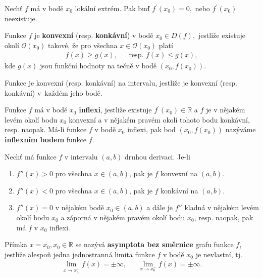 \begin{veta}
Nechť $f$ má v bodě $x_0$ lokální extrém. Pak buď $f^\prime(x_0)=0,$ nebo
$f^\prime(x_0)$ neexistuje.
\end{veta}

\begin{definition}\label{konvkonk}
Funkce $f$ je \textbf{konvexní} (resp. \textbf{konkávní}) v bodě $x_0\in D(f),$
jestliže existuje okolí $\mathscr O(x_0)$ takové, že pro všechna $x\in\mathscr O(x_0)$
platí
\begin{align*}
    f(x)\geq g(x), & & \textrm{resp. } f(x)\leq g(x),
\end{align*}
kde $g(x)$ jsou funkční hodnoty na tečně v bodě $(x_0,f(x_0)).$

Funkce je konvexní (resp. konkávní) na intervalu, jestliže je konvexní (resp.
konkávní) v~každém jeho bodě.
\end{definition}

\begin{definition}
Funkce $f$ má v bodě $x_0$ \textbf{inflexi}, jestliže existuje $f^\prime(x_0) \in
\mathbb R$ a $f$ je v nějakém levém okolí bodu $x_0$ konvexní a v nějakém pravém okolí
tohoto bodu konkávní, resp. naopak. Má-li funkce $f$ v bodě $x_0$ inflexi, pak bod
$(x_0, f(x_0))$ nazýváme \textbf{inflexním bodem} funkce $f$.
\end{definition}

\begin{veta}
Nechť má funkce $f$ v intervalu $(a,b)$ druhou derivaci. Je-li
\begin{enumerate}[$i.$]
\item $f'' (x)>0$ pro všechna $x \in (a,b)$, pak je $f$
konvexní na $(a,b)$.
\item $f''(x)<0$ pro všechna $x \in (a,b)$, pak je $f$
konkávní na $(a,b)$.
\item $f''(x)=0$ v nějakém bodě $x_0\in(a,b)$ a dále je $f''$
kladná v nějakém levém okolí bodu $x_0$ a záporná v nějakém pravém okolí bodu $x_0$,
resp. naopak, pak má $f$ v $x_0$ inflexi.
\end{enumerate}
\end{veta}

\begin{definition}
Přímka $x=x_0,x_0\in \mathbb R$ se nazývá \textbf{asymptota bez směrnice}
grafu funkce $f$, jestliže alespoň jedna jednostranná limita funkce $f$
v bodě $x_0$ je nevlastní, tj.
\begin{align*}
    \lim_{x\to x_0^+} f(x) = \pm\infty, & & \lim_{x\to x_0^-} f(x)=\pm\infty.
\end{align*}
\end{definition}

